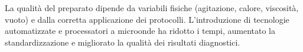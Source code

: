 La qualità del preparato dipende da variabili fisiche (agitazione, calore, viscosità, vuoto) e dalla corretta applicazione dei protocolli.  
L’introduzione di tecnologie automatizzate e processatori a microonde ha ridotto i tempi, aumentato la standardizzazione e migliorato la qualità dei risultati diagnostici.


